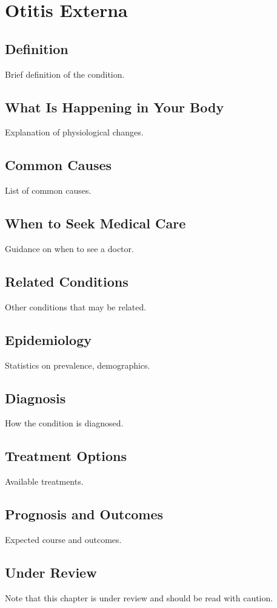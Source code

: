 \chapter{Otitis Externa}
\section*{Definition}
Brief definition of the condition.

\section*{What Is Happening in Your Body}
Explanation of physiological changes.

\section*{Common Causes}
List of common causes.

\section*{When to Seek Medical Care}
Guidance on when to see a doctor.

\section*{Related Conditions}
Other conditions that may be related.

\section*{Epidemiology}
Statistics on prevalence, demographics.

\section*{Diagnosis}
How the condition is diagnosed.

\section*{Treatment Options}
Available treatments.

\section*{Prognosis and Outcomes}
Expected course and outcomes.

\section*{Under Review}
Note that this chapter is under review and should be read with caution.
